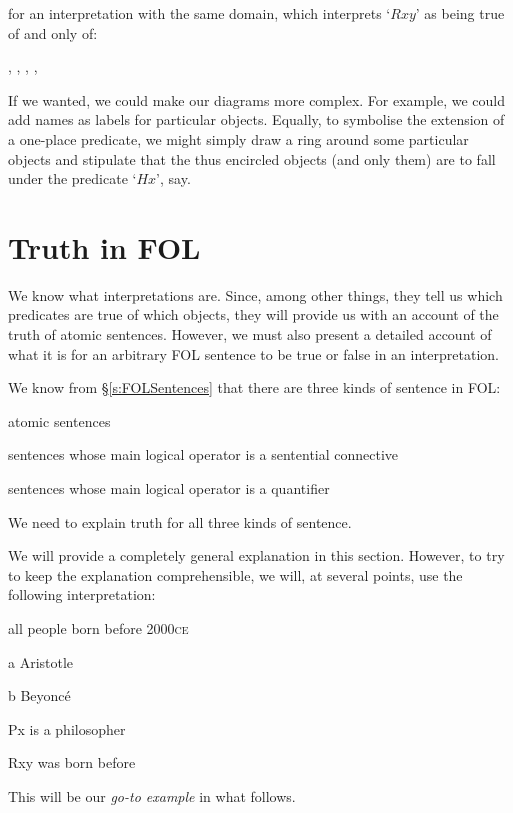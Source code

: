 \begin{center}
\end{center}
for an interpretation with the same domain, which interprets `$Rxy$' as being true of and only of:
	\begin{center}
		, 
		, 
		, 
		,
	\end{center}
If we wanted, we could make our diagrams more complex. For example, we could add names as labels for particular objects. Equally, to symbolise the extension of a one-place predicate, we might simply draw a ring around some particular objects and stipulate that the thus encircled objects (and only them) are to fall under the predicate `$Hx$', say. 


\chapter{Truth in FOL}\label{s:TruthFOL}
We know what interpretations are. Since, among other things, they tell us which predicates are true of which objects, they will provide us with an account of the truth of atomic sentences. However, we must also present a detailed account of what it is for an arbitrary FOL sentence to be true or false in an interpretation. 

We know from \S\ref{s:FOLSentences} that there are three kinds of sentence in FOL: 
	\begin{ebullet}
		\item atomic sentences
		\item sentences whose main logical operator is a sentential connective
		\item sentences whose main logical operator is a quantifier
	\end{ebullet}
We need to explain truth for all three kinds of sentence.

We will provide a completely general explanation in this section. However, to try to keep the explanation comprehensible, we will, at several points, use the following interpretation:
	\begin{ekey}
		\item[\text{domain}] all people born before 2000\textsc{ce}
		\item[a] Aristotle
		\item[b] Beyonc\'e
		\item[Px]  is a philosopher
		\item[Rxy]  was born before 
	\end{ekey}
This will be our \emph{go-to example} in what follows.

